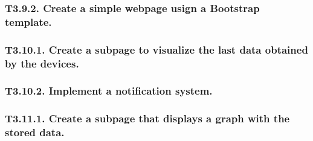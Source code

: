 \subsubsection{T3.9.2. Create a simple webpage usign a Bootstrap template.}






\subsubsection{T3.10.1. Create a subpage to visualize the last data obtained by the devices.}



\subsubsection{T3.10.2. Implement a notification system.}




\subsubsection{T3.11.1. Create a subpage that displays a graph with the stored data.}






